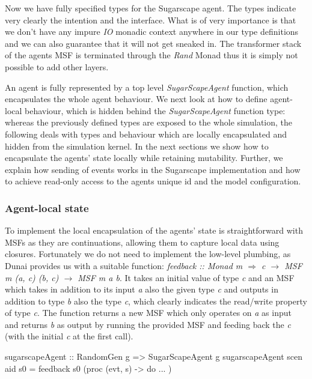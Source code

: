 Now we have fully specified types for the Sugarscape agent. The types indicate very clearly the intention and the interface. What is of very importance is that we don't have any impure \textit{IO} monadic context anywhere in our type definitions and we can also guarantee that it will not get sneaked in. The transformer stack of the agents MSF is terminated through the \textit{Rand} Monad thus it is simply not possible to add other layers. 

An agent is fully represented by a top level \textit{SugarScapeAgent} function, which encapsulates the whole agent behaviour. We next look at how to define agent-local behaviour, which is hidden behind the \textit{SugarScapeAgent} function type: whereas the previously defined types are exposed to the whole simulation, the following deals with types and behaviour which are locally encapsulated and hidden from the simulation kernel. In the next sections we show how to encapsulate the agents' state locally while retaining mutability. Further, we explain how sending of events works in the Sugarscape implementation and how to achieve read-only access to the agents unique id and the model configuration.

\subsubsection{Agent-local state}
To implement the local encapsulation of the agents' state is straightforward with MSFs as they are continuations, allowing them to capture local data using closures. Fortunately we do not need to implement the low-level plumbing, as Dunai provides us with a suitable function: \textit{feedback :: Monad m $\Rightarrow$ c $\rightarrow$ MSF m (a, c) (b, c) $\rightarrow$ MSF m a b}. It takes an initial value of type \textit{c} and an MSF which takes in addition to its input \textit{a} also the given type \textit{c} and outputs in addition to type \textit{b} also the type \textit{c}, which clearly indicates the read/write property of type \textit{c}. The function returns a new MSF which only operates on \textit{a} as input and returns \textit{b} as output by running the provided MSF and feeding back the \textit{c} (with the initial \textit{c} at the first call).

\begin{HaskellCode}
sugarscapeAgent :: RandomGen g => SugarScapeAgent g
sugarscapeAgent scen aid s0 = feedback s0 (proc (evt, s) -> do ... )
\end{HaskellCode}

